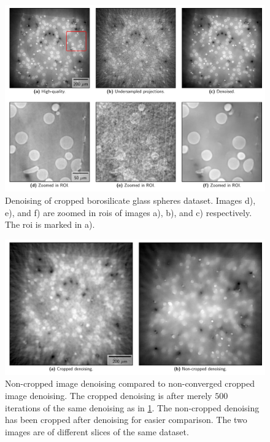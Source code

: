 \begin{figure}[htbp]
  \centering
  \includegraphics[width=.9\textwidth]{figures/croppeddenoising.pdf}
  \caption[Cropped image denoising]{Denoising of cropped borosilicate glass spheres dataset. Images d), e), and f) are zoomed in \gls{roi}s of images a), b), and c) respectively. The \gls{roi} is marked in a). }
  \label{fig:croppeddenoising}
\end{figure}

\begin{figure}[htbp]
  \centering
  \includegraphics[width=.9\textwidth]{figures/croppednoncroppedearly.pdf}
  \caption[Non-cropped image denoising compared to non-converged cropped image denoising]{Non-cropped image denoising compared to non-converged cropped image denoising. The cropped denoising is after merely $500$ iterations of the same denoising as in \cref{fig:croppeddenoising}. The non-cropped denoising has been cropped after denoising for easier comparison. The two images are of different slices of the same dataset. }
  \label{fig:croppednoncroppedearly}
\end{figure}

